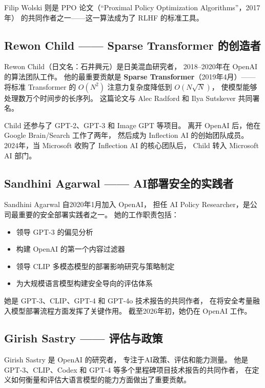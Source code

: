 Filip Wolski 则是 PPO 论文（``Proximal Policy Optimization Algorithms''，2017年）
的共同作者之一——这一算法成为了 RLHF 的标准工具。


\subsection{Rewon Child —— Sparse Transformer 的创造者}
\label{subsec:rewon-child}

Rewon Child（日文名：石井興元）是日美混血研究者，
2018--2020年在 OpenAI 的算法团队工作。
他的最重要贡献是 \textbf{Sparse Transformer}（2019年4月）——
将标准 Transformer 的 $O(N^2)$ 注意力复杂度降低到 $O(N\sqrt{N})$，
使模型能够处理数万个时间步的长序列。
这篇论文与 Alec Radford 和 Ilya Sutskever 共同署名。

Child 还参与了 GPT-2、GPT-3 和 Image GPT 等项目。
离开 OpenAI 后，他在 Google Brain/Search 工作了两年，
然后成为 Inflection AI 的创始团队成员。
2024年，当 Microsoft 收购了 Inflection AI 的核心团队后，
Child 转入 Microsoft AI 部门。


\subsection{Sandhini Agarwal —— AI部署安全的实践者}
\label{subsec:sandhini-agarwal}

Sandhini Agarwal 自2020年1月加入 OpenAI，
担任 AI Policy Researcher，是公司最重要的安全部署实践者之一。
她的工作职责包括：
\begin{itemize}[noitemsep]
  \item 领导 GPT-3 的偏见分析
  \item 构建 OpenAI 的第一个内容过滤器
  \item 领导 CLIP 多模态模型的部署影响研究与策略制定
  \item 为大规模语言模型构建安全导向的评估体系
\end{itemize}

她是 GPT-3、CLIP、GPT-4 和 GPT-4o 技术报告的共同作者，
在将安全考量融入模型部署流程方面发挥了关键作用。
截至2026年初，她仍在 OpenAI 工作。


\subsection{Girish Sastry —— 评估与政策}
\label{subsec:girish-sastry}

Girish Sastry 是 OpenAI 的研究者，
专注于AI政策、评估和能力测量。
他是 GPT-3、CLIP、Codex 和 GPT-4 等多个里程碑项目技术报告的共同作者，
在定义如何衡量和评估大语言模型的能力方面做出了重要贡献。


